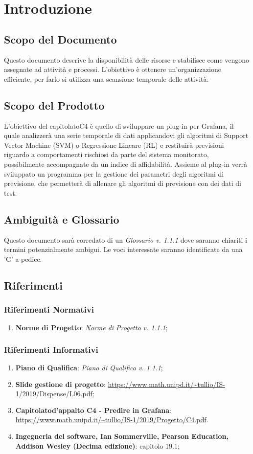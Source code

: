 \section{Introduzione}
	\subsection{Scopo del Documento}
		Questo documento descrive la disponibilità delle risorse e stabilisce come vengono assegnate ad attività e processi\glo. L'obiettivo è ottenere un'organizzazione efficiente, per farlo si utilizza una scansione temporale delle attività.
	\subsection{Scopo del Prodotto}
		L'obiettivo del capitolato\glosp C4 è quello di sviluppare un plug-in per Grafana\glo, il quale analizzerà una serie temporale di dati applicandovi gli algoritmi di Support Vector Machine (SVM\glo) o Regressione Lineare (RL\glo) e restituirà previsioni riguardo a comportamenti rischiosi da parte del sistema monitorato, possibilmente accompagnate da un indice di affidabilità. Assieme al plug-in verrà sviluppato un programma per la gestione dei parametri degli algoritmi di previsione, che permetterà di allenare gli algoritmi di previsione con dei dati di test.
	\subsection{Ambiguità e Glossario}
		Questo documento sarà corredato di un \textit{Glossario v. 1.1.1} dove saranno chiariti i termini potenzialmente ambigui.
		Le voci interessate saranno identificate da una 'G' a pedice.
	\subsection{Riferimenti}
		\subsubsection{Riferimenti Normativi}
			\begin{enumerate}
				\item \textbf{Norme di Progetto}: \textit{Norme di Progetto v. 1.1.1};
			\end{enumerate}
		\subsubsection{Riferimenti Informativi}
			\begin{enumerate}
				\item \textbf{Piano di Qualifica}: \textit{Piano di Qualifica v. 1.1.1};
				\item \textbf{Slide gestione di progetto}: \url{https://www.math.unipd.it/~tullio/IS-1/2019/Dispense/L06.pdf};
				\item \textbf{Capitolato\glosp d'appalto C4 - Predire in Grafana}:  \url{https://www.math.unipd.it/~tullio/IS-1/2019/Progetto/C4.pdf}.
				\item \textbf{Ingegneria del software, Ian Sommerville, Pearson Education, Addison Wesley (Decima edizione)}: capitolo 19.1;
			\end{enumerate}
